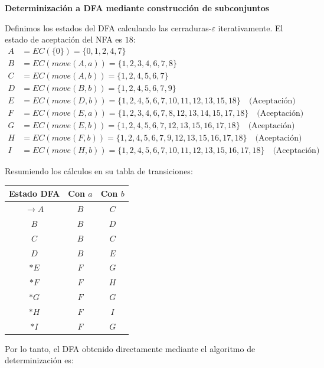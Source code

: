 \documentclass[12pt, letterpaper]{article}
\begin{document}
\begin{enumerate}
\begin{enumerate}
      \textbf{Determinización a DFA mediante construcción de subconjuntos}

      Definimos los estados del DFA calculando las cerraduras-$\varepsilon$ iterativamente. El estado de aceptación del NFA es $18$:
      \begin{align*}
        A &= EC(\{0\}) = \{0,1,2,4,7\} \\
        B &= EC(move(A, a)) = \{1,2,3,4,6,7,8\} \\
        C &= EC(move(A, b)) = \{1,2,4,5,6,7\} \\
        D &= EC(move(B, b)) = \{1,2,4,5,6,7,9\} \\
        E &= EC(move(D, b)) = \{1,2,4,5,6,7,10,11,12,13,15,18\} \quad \text{(Aceptación)}\\
        F &= EC(move(E, a)) = \{1,2,3,4,6,7,8,12,13,14,15,17,18\} \quad \text{(Aceptación)}\\
        G &= EC(move(E, b)) = \{1,2,4,5,6,7,12,13,15,16,17,18\} \quad \text{(Aceptación)}\\
        H &= EC(move(F, b)) = \{1,2,4,5,6,7,9,12,13,15,16,17,18\} \quad \text{(Aceptación)}\\
        I &= EC(move(H, b)) = \{1,2,4,5,6,7,10,11,12,13,15,16,17,18\} \quad \text{(Aceptación)}
      \end{align*}

      Resumiendo los cálculos en su tabla de transiciones:
      \begin{center}
        \begin{tabular}{c|cc}
          \toprule
          \textbf{Estado DFA} & \textbf{Con $a$} & \textbf{Con $b$} \\
          \midrule
          $\rightarrow A$ & $B$ & $C$ \\
          $B$ & $B$ & $D$ \\
          $C$ & $B$ & $C$ \\
          $D$ & $B$ & $E$ \\
          $*E$ & $F$ & $G$ \\
          $*F$ & $F$ & $H$ \\
          $*G$ & $F$ & $G$ \\
          $*H$ & $F$ & $I$ \\
          $*I$ & $F$ & $G$ \\
          \bottomrule
        \end{tabular}
      \end{center}

      Por lo tanto, el DFA obtenido directamente mediante el algoritmo
      de determinización es:


\end{enumerate}
\end{enumerate}
\end{document}
